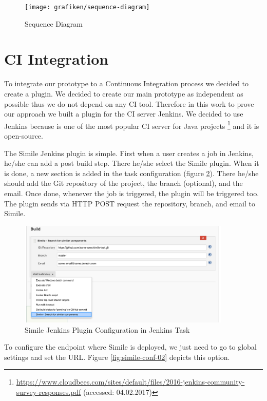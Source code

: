 \begin{figure}[H]
	\centering
    \texttt{[image: grafiken/sequence-diagram]}
    \caption{Sequence Diagram}
    \label{fig:sequence-diagram}
\end{figure}

\section{CI Integration}
\label{ci-integration}
To integrate our prototype to a Continuous Integration process we decided to create a plugin. We decided to create our main prototype as independent as possible thus we do not depend on any CI tool. Therefore in this work to prove our approach we built a plugin for the CI server Jenkins. We decided to use Jenkins because is one of the most popular CI server for Java projects \footnote{\url{https://www.cloudbees.com/sites/default/files/2016-jenkins-community-survey-responses.pdf} (accessed: 04.02.2017)} and it is open-source.

The Simile Jenkins plugin is simple. First when a user creates a job in Jenkins, he/she can add a post build step. There he/she select the Simile plugin. When it is done, a new section is added in the task configuration (figure \ref{fig:simile-conf-01}). There he/she should add the Git repository of the project, the branch (optional), and the email. Once done, whenever the job is triggered, the plugin will be triggered too. The plugin sends via HTTP POST request the repository, branch, and email to Simile.

\begin{figure}[H]
	\centering
    \includegraphics[width=0.9\textwidth]{grafiken/simile-conf-01}
    \caption{Simile Jenkins Plugin Configuration in Jenkins Task}
    \label{fig:simile-conf-01}
\end{figure}

To configure the endpoint where Simile is deployed, we just need to go to global settings and set the URL. Figure \ref{fig:simile-conf-02} depicts this option.

